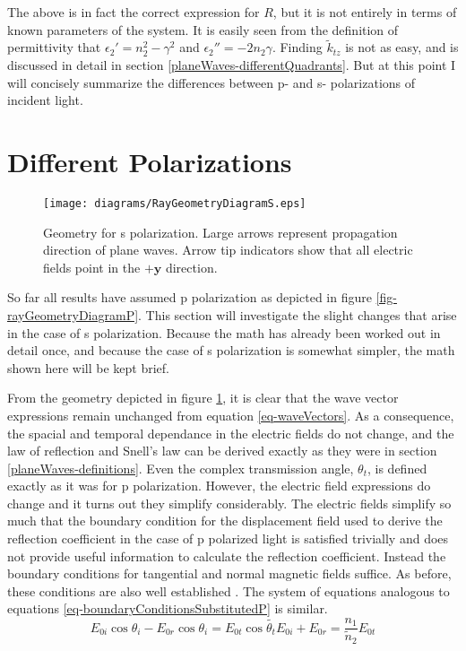 \documentclass[12pt]{uthesis-v12}
\begin{document}
The above is in fact the correct expression for $R$, but it is not entirely in terms of known parameters of the system. It is easily seen from the definition of permittivity that $\epsilon_2'=n_2^2-\gamma^2$ and $\epsilon_2''=-2n_2\gamma$. Finding $\tilde{k}_{tz}$ is not as easy, and is discussed in detail in section \ref{planeWaves-differentQuadrants}. But at this point I will concisely summarize the differences between p- and s- polarizations of incident light.


\section{Different Polarizations}
\begin{figure}[ht]
\centering
\texttt{[image: diagrams/RayGeometryDiagramS.eps]}
\caption[Geometry for s polarization.]{Geometry for s polarization. Large arrows represent propagation direction of plane waves. Arrow tip indicators show that all electric fields point in the $+\mathbf{y}$ direction.
 \label{fig-rayGeometryDiagramS}}
\end{figure}

So far all results have assumed p polarization as depicted in figure \ref{fig-rayGeometryDiagramP}.  This section will investigate the slight changes that arise in the case of s polarization.  Because the math has already been worked out in detail once, and because the case of s polarization is somewhat simpler, the math shown here will be kept brief.

From the geometry depicted in figure \ref{fig-rayGeometryDiagramS}, it is clear that the wave vector expressions remain unchanged from equation \ref{eq-waveVectors}.  As a consequence, the spacial and temporal dependance in the electric fields do not change, and the law of reflection and Snell's law can be derived exactly as they were in section \ref{planeWaves-definitions}. Even the complex transmission angle, $\theta_t$, is defined exactly as it was for p polarization. However, the electric field expressions do change and it turns out they simplify considerably. The electric fields simplify so much that the boundary condition for the displacement field used to derive the reflection coefficient in the case of p polarized light is satisfied trivially and does not provide useful information to calculate the reflection coefficient. Instead the boundary conditions for tangential and normal magnetic fields suffice. As before, these conditions are also well established \cite{Jackson}. The system of equations analogous to equations \ref{eq-boundaryConditionsSubstitutedP} is similar.
\begin{subequations}
\begin{equation}\label{eq-boundaryConditionsSubstitutedS}
E_{0i}\cos\theta_i-E_{0r}\cos\theta_i=E_{0t}\cos\tilde{\theta_t}
\end{equation}
\begin{equation}
E_{0i}+E_{0r}=\frac{n_1}{\tilde{n}_2}E_{0t}
\end{equation}
\end{subequations}
\end{document}
